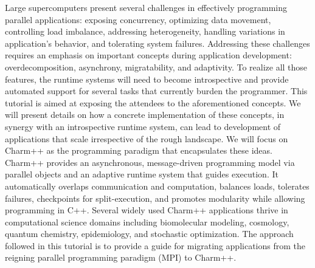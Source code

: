 Large supercomputers present several challenges in effectively programming parallel applications: exposing concurrency, optimizing data movement, controlling load imbalance, addressing heterogeneity, handling variations in application's behavior, and tolerating system failures.
Addressing these challenges requires an emphasis on important
concepts during application development: overdecomposition, asynchrony, migratability,
and adaptivity. To realize all those features, the runtime systems will need to become
introspective and provide automated support for several tasks that currently burden the programmer.
This tutorial is aimed at exposing the attendees to the aforementioned concepts. We
will present details on how a concrete implementation of these concepts, in synergy
with an introspective runtime system, can lead to development of applications that scale
irrespective of the rough landscape. We will focus on Charm++ as the
programming paradigm that encapsulates these ideas.
Charm++ provides an asynchronous, message-driven programming model via parallel
objects and an adaptive runtime system that guides execution. It automatically overlaps communication and computation,
balances loads, tolerates failures, checkpoints for split-execution, and
promotes modularity while allowing programming in C++. Several widely used
Charm++ applications thrive in computational science domains including biomolecular
modeling, cosmology, quantum chemistry, epidemiology, and  stochastic optimization. The approach followed in this tutorial is to provide a guide for migrating applications from the reigning parallel programming paradigm (MPI) to Charm++.
